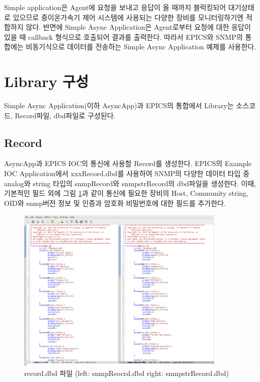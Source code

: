 \documentclass[11pt
  , a4paper
  , article
  , oneside
]{memoir}
\begin{document}
Simple application은 Agent에 요청을 보내고 응답이 올 때까지 블럭킹되어 대기상태로 있으므로 중이온가속기 제어 시스템에 사용되는 다양한 장비를 모니터링하기엔 적합하지 않다. 반면에 Simple Async Application은 Agent로부터 요청에 대한 응답이 있을 때 callback 형식으로 호출되어 결과를 출력한다. 따라서 EPICS와 SNMP의 통합에는 비동기식으로 데이터를 전송하는 Simple Async Application 예제를 사용한다.

\clearpage

\section{Library 구성}
Simple Async Application(이하 AsyncApp)과 EPICS의 통합에서 Library는 소스코드, Record파일, dbd파일로 구성된다.

\subsection{Record}
AsyncApp과 EPICS IOC의 통신에 사용할 Record를 생성한다. EPICS의 Example IOC Application에서 xxxRecord.dbd를 사용하여 SNMP의 다양한 데이터 타입 중 analog와 string 타입의 snmpRecord와 snmpstrRecord의 dbd파일을 생성한다. 이때, 기본적인 필드 외에 그림 \ref{fig:recorddbd}과 같이 통신에 필요한 장비의 Host, Community string, OID와 snmp버전 정보 및 인증과 암호화 비밀번호에 대한 필드를 추가한다.

\begin{figure}[h!]
  \centering
  \includegraphics[width=0.89\textwidth]{./images/recorddbd.eps}
  \caption{record.dbd 파일 (left: snmpReocrd.dbd right: snmpstrRecord.dbd)}
  \label{fig:recorddbd}   
\end{figure}
\end{document}
